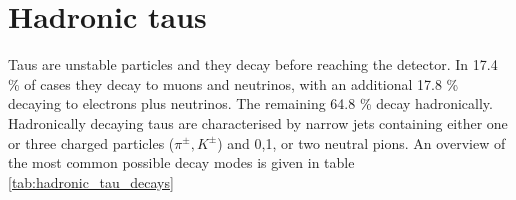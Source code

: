 
\section{Hadronic taus}
\label{sec:objects_tau}
Taus are unstable particles and they decay before reaching the detector. In 17.4 \% of 
cases they decay to muons and neutrinos, with an additional 17.8 \% decaying to electrons
plus neutrinos. The remaining 64.8 \% decay hadronically. Hadronically decaying
taus are characterised by narrow jets containing either one or three charged
particles ($\pi^{\pm}, K^{\pm}$) and 0,1, or two neutral pions. An overview
of the most common possible decay modes is given in table \ref{tab:hadronic_tau_decays}

